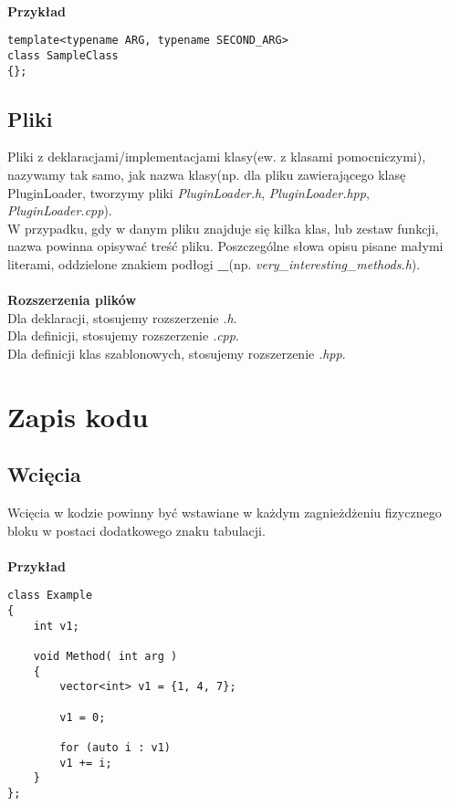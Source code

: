 \documentclass[titlepage]{article}
\begin{document}
\paragraph{}
\textbf{Przykład}
\begin{lstlisting}
template<typename ARG, typename SECOND_ARG>
class SampleClass
{};

\end{lstlisting}
\subsection{Pliki}
Pliki z deklaracjami/implementacjami klasy(ew. z klasami pomocniczymi), nazywamy tak samo, jak nazwa klasy(np. dla pliku zawierającego klasę PluginLoader, tworzymy pliki \textit{PluginLoader.h}, \textit{PluginLoader.hpp}, \textit{PluginLoader.cpp}).\\
W przypadku, gdy w danym pliku znajduje się kilka klas, lub zestaw funkcji, nazwa powinna opisywać treść pliku. Poszczególne słowa opisu pisane małymi literami, oddzielone znakiem podłogi \textbf{\_}(np. \textit{very\_interesting\_methods.h}).
\paragraph{}
\textbf{Rozszerzenia plików}\\
Dla deklaracji, stosujemy rozszerzenie \textit{.h}.\\
Dla definicji, stosujemy rozszerzenie \textit{.cpp}.\\
Dla definicji klas szablonowych, stosujemy rozszerzenie \textit{.hpp}.
\section{Zapis kodu}
\subsection{Wcięcia}
Wcięcia w kodzie powinny być wstawiane w każdym zagnieżdżeniu fizycznego bloku w postaci dodatkowego znaku tabulacji.
\paragraph{}
\textbf{Przykład}
\begin{lstlisting}
class Example
{
	int v1;

	void Method( int arg )
	{
		vector<int> v1 = {1, 4, 7};

		v1 = 0;

		for (auto i : v1)
		v1 += i;
	}
};
\end{lstlisting}
\end{document}
